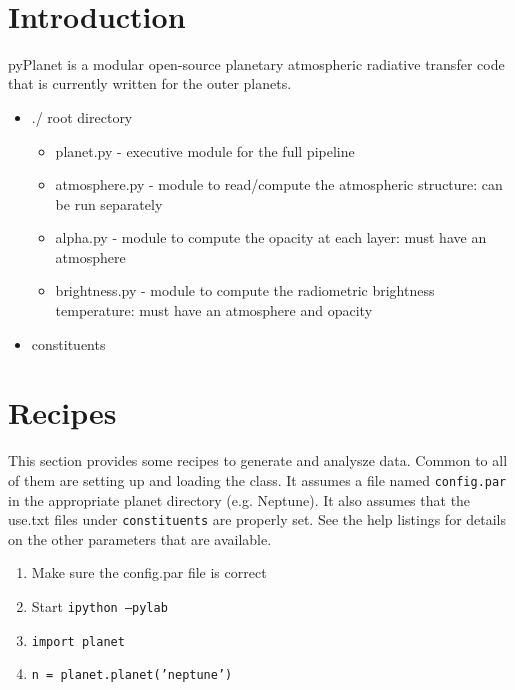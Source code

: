 \documentclass[11pt]{article}
\begin{document}
{ \\}
\vspace*{0.5cm}

\section{Introduction} 
pyPlanet is a modular open-source planetary atmospheric radiative transfer code that is currently written for the outer planets.  

\begin{itemize}
\item ./ root directory 
	\begin{itemize}
	\item planet.py - executive module for the full pipeline
	\item atmosphere.py - module to read/compute the atmospheric structure: can be run separately
	\item alpha.py - module to compute the opacity at each layer:  must have an atmosphere
	\item brightness.py - module to compute the radiometric brightness temperature:  must have an atmosphere and opacity
	\end{itemize}
\item constituents
\end{itemize}

\section{Recipes}
This section provides some recipes to generate and analysze data.  Common to all of them are setting up and loading the class.  It assumes a file named \texttt{config.par} in the appropriate planet directory (e.g. Neptune).  It also assumes that the use.txt files under \texttt{constituents} are properly set.  See the help listings for details on the other parameters that are available.
\begin{enumerate}
\item Make sure the config.par file is correct
\item Start \texttt{ipython --pylab}
\item \texttt{import planet}
\item \texttt{n = planet.planet('neptune')}
\end{enumerate}
\end{document}
